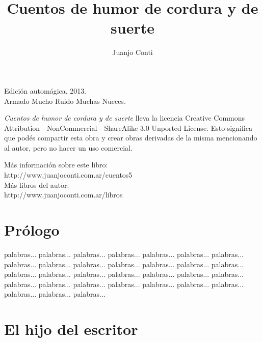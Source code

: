 \documentclass[11pt,twoside,openright,a6paper]{book}
\title{Cuentos de humor de cordura y de suerte}
\author{Juanjo Conti}
\date{}
\begin{document}
\pagestyle{plain}

\maketitle

\cleardoublepage

\thispagestyle{empty}
\noindent
Edición automágica. 2013.\\
Armado Mucho Ruido Muchas Nueces.

\vspace{0.5cm}

\noindent
\emph{Cuentos de humor de cordura y de suerte} lleva la licencia 
Creative Commons Attribution - NonCommercial - ShareAlike 3.0 Unported License.
Esto significa que podés compartir esta obra y crear obras derivadas de la misma
mencionando al autor, pero no ha\-cer un uso comercial.

\vfill

\noindent
Más información sobre este libro:\\
http://www.juanjoconti.com.ar/cuentos5\\

\noindent
Más libros del autor:\\
http://www.juanjoconti.com.ar/libros

\cleardoublepage

\noindent
\begin{flushright}
\emph{
\emph{Cuentos de humor de cordura y de suerte}\\
está dedicado a...
\end{flushright}

\cleardoublepage

\renewcommand*\contentsname{Índice}

\tableofcontents

\chapter*{Prólogo}

palabras... palabras... palabras... palabras... palabras... palabras... palabras... palabras... palabras... palabras... palabras... palabras... palabras... palabras... palabras... palabras... palabras... palabras... palabras... palabras... palabras... palabras... palabras... palabras... palabras... palabras... palabras... palabras... palabras... palabras... palabras... 

\chapter*{El hijo del escritor}
\end{document}
